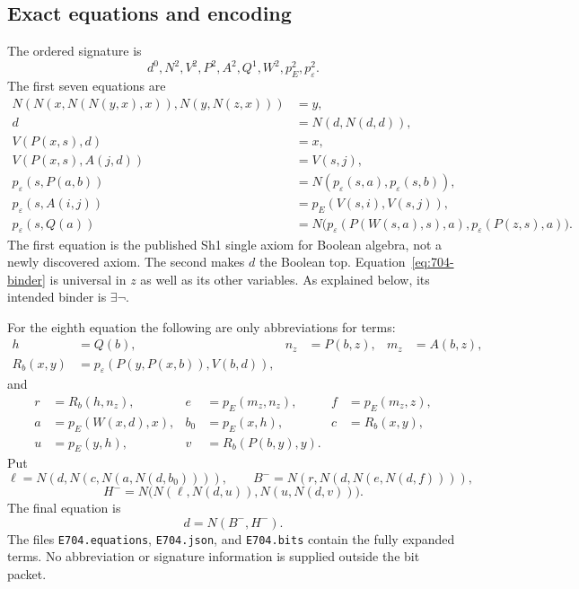 \subsection{Exact equations and encoding}

The ordered signature is
\[
 d^0,N^2,V^2,P^2,A^2,Q^1,W^2,p_E^2,p_\varepsilon^2.
\]
The first seven equations are
\begin{align}
 N(N(x,N(N(y,x),x)),N(y,N(z,x)))&=y,\label{eq:704-sh1}\\
 d&=N(d,N(d,d)),\label{eq:704-top}\\
 V(P(x,s),d)&=x,\label{eq:704-head}\\
 V(P(x,s),A(j,d))&=V(s,j),\label{eq:704-tail}\\
 p_\varepsilon(s,P(a,b))
   &=N(p_\varepsilon(s,a),p_\varepsilon(s,b)),\label{eq:704-nand}\\
 p_\varepsilon(s,A(i,j))
   &=p_E(V(s,i),V(s,j)),\label{eq:704-atom}\\
 p_\varepsilon(s,Q(a))
   &=N\bigl(p_\varepsilon(P(W(s,a),s),a),
            p_\varepsilon(P(z,s),a)\bigr).
       \label{eq:704-binder}
\end{align}
The first equation is the published Sh1 single axiom for Boolean algebra,
not a newly discovered axiom.  The second makes $d$ the Boolean top.
Equation~\eqref{eq:704-binder} is universal in $z$ as well as its other
variables.  As explained below, its intended binder is $\exists\neg$.

For the eighth equation the following are only abbreviations for terms:
\begin{align*}
 h&=Q(b),&n_z&=P(b,z),&m_z&=A(b,z),\\
 R_b(x,y)&=p_\varepsilon(P(y,P(x,b)),V(b,d)),&&&
\end{align*}
and
\begin{align*}
 r&=R_b(h,n_z),&e&=p_E(m_z,n_z),&f&=p_E(m_z,z),\\
 a&=p_E(W(x,d),x),&b_0&=p_E(x,h),&c&=R_b(x,y),\\
 u&=p_E(y,h),&v&=R_b(P(b,y),y).&&
\end{align*}
Put
\[
 \ell=N(d,N(c,N(a,N(d,b_0)))),\qquad
 B^-=N(r,N(d,N(e,N(d,f)))),
\]
\[
 H^-=N\bigl(N(\ell,N(d,u)),N(u,N(d,v))\bigr).
\]
The final equation is
\begin{equation}
                         d=N(B^-,H^-).
 \label{eq:704-closure}
\end{equation}
The files \texttt{E704.equations}, \texttt{E704.json}, and
\texttt{E704.bits} contain the fully expanded terms.  No abbreviation
or signature information is supplied outside the bit packet.

